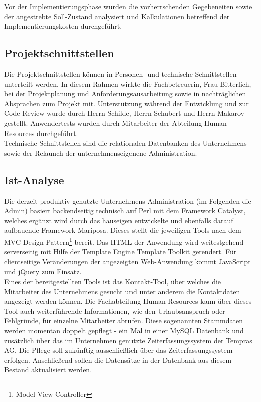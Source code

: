 Vor der Implementierungsphase wurden die vorherrschenden Gegebeneiten sowie der angestrebte Soll-Zustand analysiert und   Kalkulationen betreffend der Implementierungskosten durchgeführt.

\subsection{Projektschnittstellen}
    Die Projektschnittstellen können in Personen- und technische Schnittstellen unterteilt werden. In diesem Rahmen wirkte die Fachbetreuerin, Frau Bitterlich, bei der Projektplanung und Anforderungsausarbeitung sowie in nachträglichen Absprachen zum Projekt mit. Unterstützung während der Entwicklung und zur Code Review wurde durch Herrn Schilde, Herrn Schubert und Herrn Makarov gestellt. Anwendertests wurden durch Mitarbeiter der Abteilung Human Resources durchgeführt.\\
    Technische Schnittstellen sind die relationalen Datenbanken des Unternehmens sowie der Relaunch der unternehmenseigenene Administration.

\subsection{Ist-Analyse}
    Die derzeit produktiv genutzte Unternehmens-Administration (im Folgenden \glqq die Admin\grqq{}) basiert backendseitig technisch auf Perl mit dem Framework \glqq Catalyst\grqq{}, welches ergänzt wird durch das hauseigen entwickelte und ebenfalls darauf aufbauende Framework \glqq Mariposa\grqq{}. \mbox{Dieses} stellt die jeweiligen Tools nach dem MVC-Design Pattern\footnote{Model View Controller} bereit. Das HTML der Anwendung wird weitestgehend serverseitig mit Hilfe der Template Engine \glqq Template Toolkit\grqq{} gerendert. Für clientseitige Veränderungen der angezeigten Web-Anwendung kommt JavaScript und jQuery zum Einsatz.\\
    Eines der bereitgestellten Tools ist das Kontakt-Tool, über welches die Mitarbeiter des Unternehmens gesucht und unter anderem die Kontaktdaten angezeigt werden können. Die Fachabteilung Human Resources kann über dieses Tool auch weiterführende Informationen, wie den Urlaubsanspruch oder Fehlgründe, für einzelne Mitarbeiter abrufen. Diese sogenannten Stammdaten werden momentan doppelt gepflegt - ein Mal in einer MySQL Datenbank und zusätzlich über das im Unternehmen genutzte Zeiterfassungssystem der Tempras AG. Die \mbox{Pflege} soll zukünftig ausschließlich über das Zeiterfassungssystem erfolgen. Anschließend \mbox{sollen} die Datensätze in der Datenbank aus diesem Bestand aktualisiert werden.

